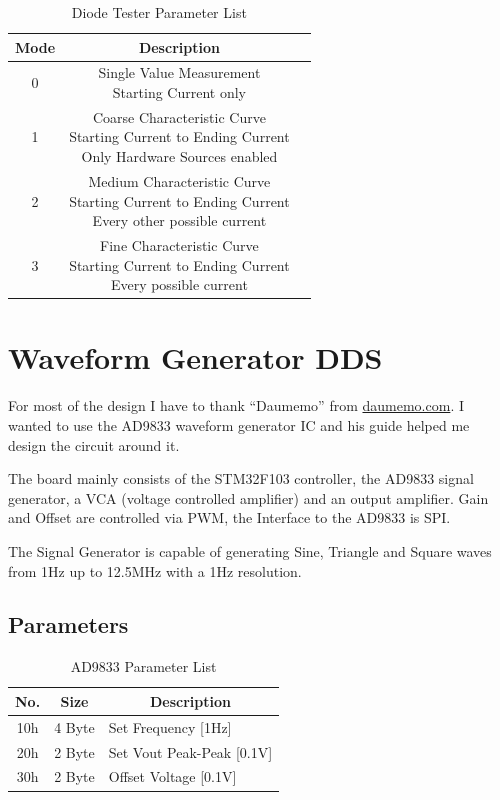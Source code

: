 \begin{table}[H]
    \centering
    \begin{tabular}{|c|c|l|}
        \hline
        \textbf{Mode}   &  \multicolumn{1}{|c|}{\textbf{Description}}\\ \hline \hline
        0   &  \makecell[l]{Single Value Measurement \\ Starting Current only}\\ \hline
		1   &  \makecell[l]{Coarse Characteristic Curve \\ Starting Current to Ending Current \\ Only Hardware Sources enabled}\\ \hline
		2   &  \makecell[l]{Medium Characteristic Curve \\ Starting Current to Ending Current \\ Every other possible current}\\ \hline
		3   &  \makecell[l]{Fine Characteristic Curve \\ Starting Current to Ending Current \\ Every possible current}\\ \hline
    \end{tabular}
	\caption{Diode Tester Parameter List}
\label{tab:Modes-Diode}
\end{table}
\section{Waveform Generator DDS}
For most of the design I have to thank ``Daumemo'' from \textcolor{blue}{\href{https://daumemo.com}{daumemo.com}}. I wanted to use the AD9833 waveform generator IC and his guide helped me design the circuit around it. 

The board mainly consists of the STM32F103 controller, the AD9833 signal generator, a VCA (voltage controlled amplifier) and an output amplifier. Gain and Offset are controlled via PWM, the Interface to the AD9833 is SPI. 

The Signal Generator is capable of generating Sine, Triangle and Square waves from 1Hz up to 12.5MHz with a 1Hz resolution. 

\subsection{Parameters}
\begin{table}[H]
    \centering
    \begin{tabular}{|c|c|l|}
        \hline
        \textbf{No.}   &   \textbf{Size} & \multicolumn{1}{|c|}{\textbf{Description}}\\ \hline \hline
        10h   &  4 Byte &  Set Frequency [1Hz]\\ \hline
		20h   &  2 Byte &  Set Vout Peak-Peak [0.1V]\\ \hline
		30h	  &  2 Byte &  Offset Voltage [0.1V] \\ \hline
    \end{tabular}
	\caption{AD9833 Parameter List}
\label{tab:Par-Waveform9833}
\end{table}

